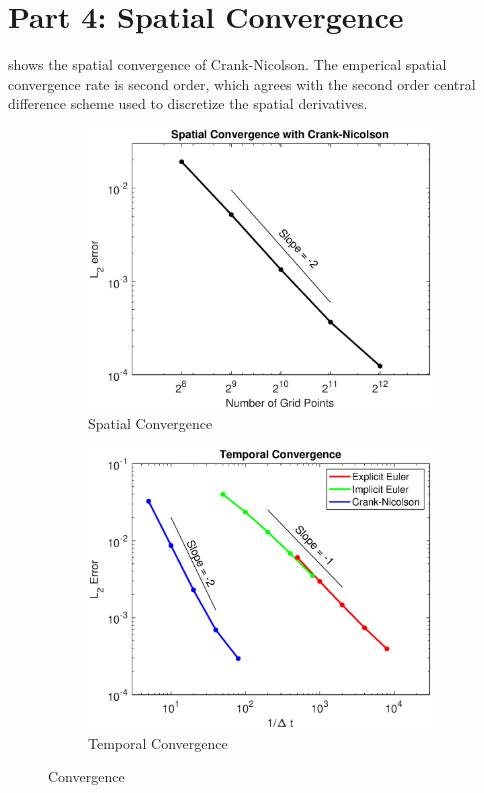 \documentclass[reqno, 12pt]{amsart}
\begin{document}
    \section*{Part 4: Spatial Convergence}
    \noindent {} shows the spatial convergence of Crank-Nicolson.
    The emperical spatial convergence rate is second order, which agrees with the second order central difference scheme used to discretize the spatial derivatives.
    \begin{figure}
        \centering
        \begin{subfigure}[t]{0.4\textwidth}
            \includegraphics[width=\textwidth]{P4.eps}
            \caption{Spatial Convergence}
            \label{fig:spatConv}
        \end{subfigure}
        \begin{subfigure}[t]{0.4\textwidth}
            \includegraphics[width=\textwidth]{P5.eps}
            \caption{Temporal Convergence}
            \label{fig:tempConv}
        \end{subfigure}
        \caption{Convergence}
    \end{figure}
\end{document}
